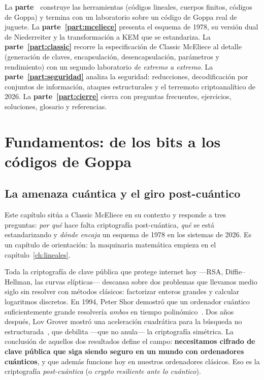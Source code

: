 \documentclass[11pt,a4paper,oneside]{report}
\begin{document}
\begin{roadmap}
La \textbf{parte~\ref{part:fundamentos}} construye las herramientas (códigos lineales,
cuerpos finitos, códigos de Goppa) y termina con un laboratorio sobre un código de Goppa
real de juguete. La \textbf{parte~\ref{part:mceliece}} presenta el esquema de 1978, su
versión dual de Niederreiter y la transformación a KEM que se estandariza. La
\textbf{parte~\ref{part:classic}} recorre la especificación de Classic McEliece al
detalle (generación de claves, encapsulación, desencapsulación, parámetros y
rendimiento) con un segundo laboratorio \emph{de extremo a extremo}. La
\textbf{parte~\ref{part:seguridad}} analiza la seguridad: reducciones, decodificación por
conjuntos de información, ataques estructurales y el terremoto criptoanalítico
de 2026. La \textbf{parte~\ref{part:cierre}} cierra con preguntas frecuentes, ejercicios,
soluciones, glosario y referencias.
\end{roadmap}

\clearpage
\tableofcontents
\clearpage
\listoffigures
\listoftables
\clearpage

\part{Fundamentos: de los bits a los códigos de Goppa}\label{part:fundamentos}

\chapter{La amenaza cuántica y el giro post-cuántico}\label{ch:pqc}

\begin{roadmap}
Este capítulo sitúa a Classic McEliece en su contexto y responde a tres
preguntas: \emph{por qué} hace falta criptografía post-cuántica, \emph{qué}
se está estandarizando y \emph{dónde encaja} un esquema de 1978 en los
sistemas de 2026. Es un capítulo de orientación: la maquinaria matemática
empieza en el capítulo~\ref{ch:lineales}.
\end{roadmap}

Toda la criptografía de clave pública que protege internet hoy ---RSA,
Diffie--Hellman, las curvas elípticas--- descansa sobre dos problemas que
llevamos medio siglo sin resolver con métodos clásicos: factorizar enteros
grandes y calcular logaritmos discretos. En 1994, Peter Shor demostró que un
ordenador cuántico suficientemente grande resolvería \emph{ambos} en tiempo
polinómico~\cite{shor1994}. Dos años después, Lov Grover mostró una
aceleración cuadrática para la búsqueda no estructurada~\cite{grover1996},
que debilita ---que no anula--- la criptografía simétrica. La conclusión
de aquellos dos resultados define el campo: \textbf{necesitamos cifrado de
clave pública que siga siendo seguro en un mundo con ordenadores cuánticos},
y que además funcione hoy en nuestros ordenadores clásicos. Eso es la
criptografía \emph{post-cuántica} (o \emph{crypto resiliente ante lo
cuántico}).
\end{document}
